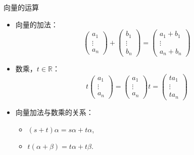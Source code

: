 \documentclass[10pt]{beamer}
\begin{document}

\begin{frame}

\begin{block}{向量的运算}
\begin{itemize}
\item<1-> 向量的加法：
$$\begin{pmatrix} a_1 \\ \vdots \\ a_n \end{pmatrix} + \begin{pmatrix} b_1 \\ \vdots \\ b_n \end{pmatrix} = \begin{pmatrix} a_1 + b_1 \\ \vdots \\ a_n + b_n \end{pmatrix}$$
\item<2-> 数乘，$t\in\mathbb{R}$：
$$t \begin{pmatrix} a_1 \\ \vdots \\ a_n \end{pmatrix} = \begin{pmatrix} a_1 \\ \vdots \\ a_n \end{pmatrix}t = \begin{pmatrix} ta_1 \\ \vdots \\ ta_n \end{pmatrix}$$
\item<3-> 向量加法与数乘的关系：
\begin{itemize}
\item $(s+t)\alpha = s\alpha + t\alpha$,
\item $t(\alpha + \beta) = t\alpha + t\beta$.
\end{itemize}
\end{itemize}
\end{block}

\end{frame}


\end{document}

